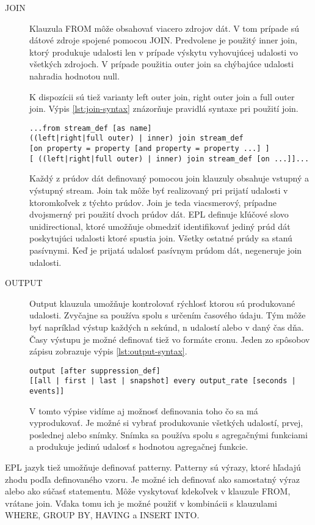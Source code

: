 \begin{description}
			\item[JOIN] Klauzula FROM môže obsahovať viacero zdrojov dát. V tom prípade sú dátové zdroje spojené pomocou JOIN. Predvolene je použitý inner join, ktorý produkuje udalosti len v prípade výskytu vyhovujúcej udalosti vo všetkých zdrojoch. V prípade použitia outer join sa chýbajúce udalosti nahradia hodnotou null.
	
			K dispozícii sú tiež varianty left outer join, right outer join a full outer join. Výpis \ref{lst:join-syntax} znázorňuje pravidlá syntaxe pri použití join.
			\begin{lstlisting}[label=lst:join-syntax]
...from stream_def [as name] 
((left|right|full outer) | inner) join stream_def 
[on property = property [and property = property ...] ]
[ ((left|right|full outer) | inner) join stream_def [on ...]]...
			\end{lstlisting}
			Každý z prúdov dát definovaný pomocou join klauzuly obsahuje vstupný a výstupný stream. Join tak môže byť realizovaný pri prijatí udalosti v ktoromkoľvek z týchto prúdov. Join je teda viacsmerový, prípadne dvojsmerný pri použití dvoch prúdov dát.
			EPL definuje kľúčové slovo unidirectional, ktoré umožňuje obmedziť identifikovať jediný prúd dát poskytujúci udalosti ktoré spustia join. Všetky ostatné prúdy sa stanú pasívnymi. Keď je prijatá udalosť pasívnym prúdom dát, negeneruje join udalosti.
	
			\item[OUTPUT] Output klauzula umožňuje kontrolovať rýchlosť ktorou sú produkované udalosti. Zvyčajne sa používa spolu s určením časového údaju. Tým môže byť napríklad výstup každých n sekúnd, n udalostí alebo v daný čas dňa. Časy výstupu je možné definovať tiež vo formáte cronu. Jeden zo spôsobov zápisu zobrazuje výpis \ref{lst:output-syntax}.
			\begin{lstlisting}[label=lst:output-syntax]
output [after suppression_def] 
[[all | first | last | snapshot] every output_rate [seconds | events]]
			\end{lstlisting}
			V tomto výpise vidíme aj možnosť definovania toho čo sa má vyprodukovať. Je možné si vybrať produkovanie všetkých udalostí, prvej, poslednej alebo snímky. Snímka sa používa spolu s agregačnými funkciami a produkuje jedinú udalosť s hodnotou agregačnej funkcie.
			
		\end{description}
		
		EPL jazyk tiež umožňuje definovať patterny. Patterny sú výrazy, ktoré hľadajú zhodu podľa definovaného vzoru. Je možné ich definovať ako samostatný výraz alebo ako súčasť statementu. Môže vyskytovať kdekoľvek v klauzule FROM, vrátane join. Vďaka tomu ich je možné použiť v kombinácii s klauzulami WHERE, GROUP BY, HAVING a INSERT INTO.
		
